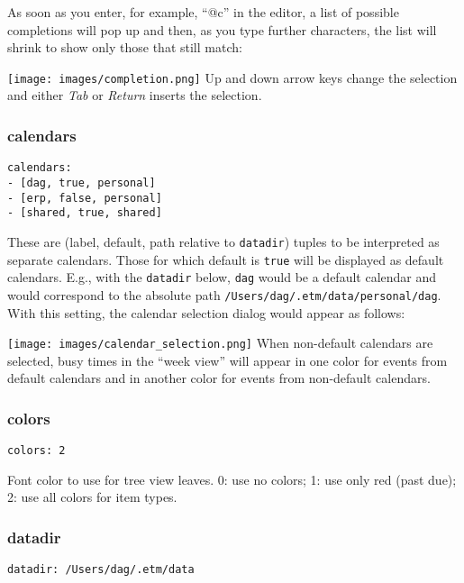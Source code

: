 \documentclass[]{article}
\makeatletter
\def\maxwidth{\ifdim\Gin@nat@width>\linewidth\linewidth
\else\Gin@nat@width\fi}
\let\Oldincludegraphics\includegraphics
\renewcommand{\includegraphics}[1]{\Oldincludegraphics[width=\maxwidth]{#1}}
\makeatother
\begin{document}
As soon as you enter, for example, ``@c'' in the editor, a list of
possible completions will pop up and then, as you type further
characters, the list will shrink to show only those that still match:

\texttt{[image: images/completion.png]}
Up and down arrow keys change the selection and either \emph{Tab} or
\emph{Return} inserts the selection.

\subsubsection{calendars}

\begin{verbatim}
calendars:
- [dag, true, personal]
- [erp, false, personal]
- [shared, true, shared]
\end{verbatim}

These are (label, default, path relative to \texttt{datadir}) tuples to
be interpreted as separate calendars. Those for which default is
\texttt{true} will be displayed as default calendars. E.g., with the
\texttt{datadir} below, \texttt{dag} would be a default calendar and
would correspond to the absolute path
\texttt{/Users/dag/.etm/data/personal/dag}. With this setting, the
calendar selection dialog would appear as follows:

\texttt{[image: images/calendar\_selection.png]}
When non-default calendars are selected, busy times in the ``week view''
will appear in one color for events from default calendars and in
another color for events from non-default calendars.

\subsubsection{colors}

\begin{verbatim}
colors: 2
\end{verbatim}

Font color to use for tree view leaves. 0: use no colors; 1: use only
red (past due); 2: use all colors for item types.

\subsubsection{datadir}

\begin{verbatim}
datadir: /Users/dag/.etm/data
\end{verbatim}
\end{document}
